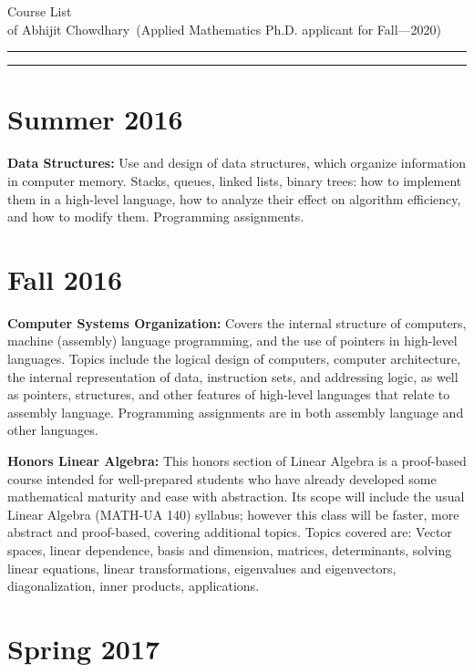 \documentclass[11pt]{article}
\newcommand{\soptitle}{Course List}
\newcommand{\yourname}{Abhijit Chowdhary}
\begin{document}
\begin{center}\LARGE\soptitle\\
\large of \yourname\ (Applied Mathematics Ph.D. applicant for Fall---2020)
\end{center}

\hrule
\vspace{1pt}
\hrule height 1pt

\bigskip

\section*{Summer 2016}

{\bf Data Structures:} Use and design of data structures, which organize
information in computer memory. Stacks, queues, linked lists, binary trees: how
to implement them in a high-level language, how to analyze their effect on
algorithm efficiency, and how to modify them. Programming assignments.

\section*{Fall 2016}

{\bf Computer Systems Organization:} Covers the internal structure of computers,
machine (assembly) language programming, and the use of pointers in high-level
languages. Topics include the logical design of computers, computer
architecture, the internal representation of data, instruction sets, and
addressing logic, as well as pointers, structures, and other features of
high-level languages that relate to assembly language. Programming assignments
are in both assembly language and other languages.

{\bf Honors Linear Algebra:} This honors section of Linear Algebra is
a proof-based course intended for well-prepared students who have already
developed some mathematical maturity and ease with abstraction. Its scope will
include the usual Linear Algebra (MATH-UA 140) syllabus; however this class will
be faster, more abstract and proof-based, covering additional topics. Topics
covered are: Vector spaces, linear dependence, basis and dimension, matrices,
determinants, solving linear equations, linear transformations, eigenvalues and
eigenvectors, diagonalization, inner products, applications.

\section*{Spring 2017}
\end{document}
